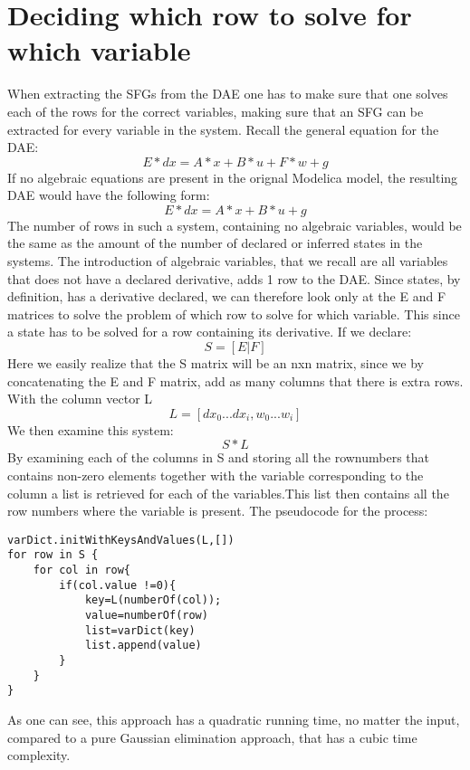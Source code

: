 
\section{Deciding which row to solve for which variable}
When extracting the SFGs from the DAE one has to make sure that one solves each of the rows for the correct variables, making sure that an SFG can be extracted for every variable in the system. Recall the general equation for the DAE:
\begin{equation}
E*dx = A*x + B*u + F*w + g
\end{equation}
If no algebraic equations are present in the orignal Modelica model, the resulting DAE would have the following form:
\begin{equation}
E*dx = A*x + B*u + g
\end{equation}
The number of rows in such a system, containing no algebraic variables, would be the same as the amount of the number of declared or inferred states in the systems. The introduction of algebraic variables, that we recall are all variables that does not have a declared derivative, adds 1 row to the DAE. Since states, by definition, has a derivative declared, we can therefore look only at the E and F matrices to solve the problem of which row to solve for which variable. This since a state has to be solved for a row containing its derivative. If we declare:
\begin{equation}
S=[E|F]
\end{equation}
Here we easily realize that the S matrix will be an nxn matrix, since we by concatenating the E and F matrix, add as many columns that there is extra rows.\\
With the column vector L
\begin{equation}
L=[dx_0...dx_i, w_0...w_i]
\end{equation}
We then examine this system:
\begin{equation}
S*L
\end{equation}
By examining each of the columns in S and storing all the rownumbers that contains non-zero elements together with the variable corresponding to the column a list is retrieved for each of the variables.This  list then contains all the row numbers where the variable is present.
The pseudocode for the process:

\begin{lstlisting}
varDict.initWithKeysAndValues(L,[])
for row in S {
	for col in row{
		if(col.value !=0){
			key=L(numberOf(col));
			value=numberOf(row)
			list=varDict(key)
			list.append(value)		
		}
	}			
}
\end{lstlisting}
As one can see, this approach has a quadratic running time, no matter the input, compared to a pure Gaussian elimination approach, that has a cubic time complexity.

